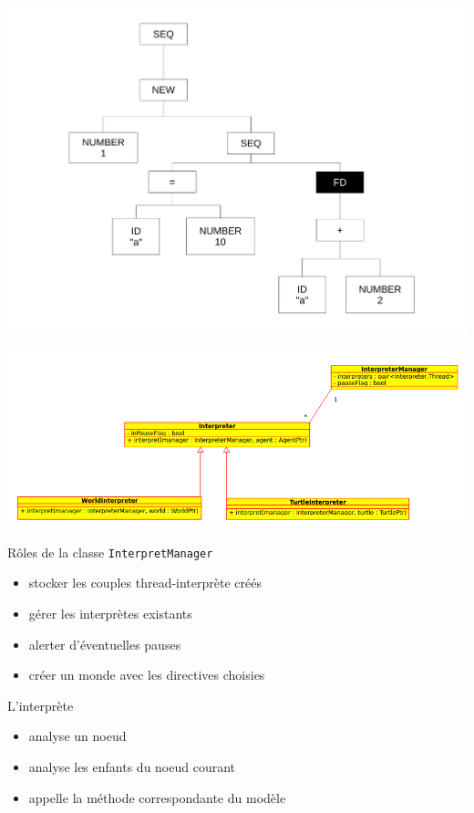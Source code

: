 \begin{frame}
\includegraphics[scale=0.3]{doc/Presentation/img/arbre8.pdf}
\end{frame}

\begin{frame}
\includegraphics[scale=0.3]{doc/report/uml/interpreterUML.png}
\end{frame}

\begin{frame}[fragile]
Rôles de la classe \verb|InterpretManager|
\begin{itemize}
	\item stocker les couples thread-interprète créés
	\item gérer les interprètes existants
	\item alerter d'éventuelles pauses
	\item créer un monde avec les directives choisies
\end{itemize}
\end{frame}

\begin{frame}

L'interprète
\begin{itemize}
	\item analyse un noeud
	\item analyse les enfants du noeud courant
	\item appelle la méthode correspondante du modèle
\end{itemize}
\end{frame}
